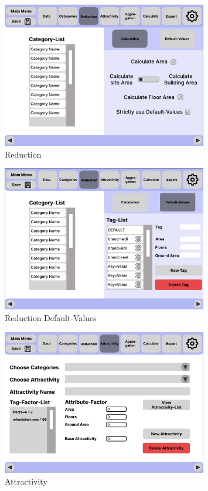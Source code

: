 \documentclass[parskip=full]{scrartcl} %
\begin{document}
\begin{figure}
    \centering
    \includegraphics[width=0.8\textwidth,cfbox=black 1pt 0pt]{pictures/Reduction.png}
    \caption{Reduction}
\end{figure}

\begin{figure}
    \centering
    \includegraphics[width=0.8\textwidth,cfbox=black 1pt 0pt]{pictures/Reduction 2.png}
    \caption{Reduction Default-Values}
\end{figure}

\begin{figure}
    \centering
    \includegraphics[width=0.8\textwidth,cfbox=black 1pt 0pt]{pictures/Attractivity.png}
    \caption{Attractivity}
\end{figure}
\end{document}
